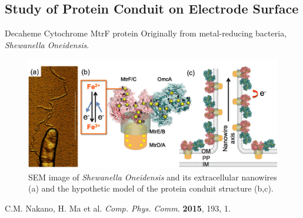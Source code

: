 \documentclass{beamer}
\begin{document}
\subsection{Study of Protein Conduit on Electrode Surface}
\begin{frame}{Decaheme Cytochrome MtrF protein } 
	Originally from metal-reducing bacteria, \emph{Shewanella Oneidensis}. 
	\begin{figure}
		\includegraphics[width=\linewidth]{Pics/MtrF.png}
		\caption{SEM image of \emph{Shewanella Oneidensis} and its extracellular nanowires (a) and the hypothetic model of the protein conduit structure (b,c). }
	\end{figure} 
	\hfill {\tiny C.M. Nakano, H. Ma et al. \emph{Comp. Phys. Comm.} \textbf{2015}, 193, 1.
	}
\end{frame}
\end{document}

